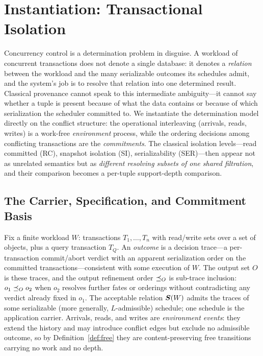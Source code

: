 %
\section{Instantiation: Transactional Isolation}
\label{sec:transactions}

Concurrency control is a determination problem in disguise. A workload of
concurrent transactions does not denote a single database: it denotes a
\emph{relation} between the workload and the many serializable outcomes its
schedules admit, and the system's job is to resolve that relation into one
determined result. Classical provenance cannot speak to this intermediate
ambiguity---it cannot say whether a tuple is present because of what the data
contains or because of which serialization the scheduler committed to. We
instantiate the determination model directly on the conflict structure: the
operational interleaving (arrivals, reads, writes) is a work-free
\emph{environment} process, while the ordering decisions among conflicting
transactions are the \emph{commitments}. The classical isolation levels---read
committed (RC), snapshot isolation (SI), serializability (SER)---then appear not
as unrelated semantics but as \emph{different resolving subsets of one shared
filtration}, and their comparison becomes a per-tuple support-depth comparison.

\subsection{The Carrier, Specification, and Commitment Basis}
\label{sec:txn-setup}

Fix a finite workload $W$: transactions $T_1,\dots,T_n$ with read/write sets
over a set of objects, plus a query transaction $T_Q$. An \emph{outcome} is a
decision trace---a per-transaction commit/abort verdict with an apparent
serialization order on the committed transactions---consistent with some
execution of $W$. The output set $O$ is these traces, and the output refinement
order $\preceq_O$ is sub-trace inclusion: $o_1 \preceq_O o_2$ when $o_2$ resolves
further fates or orderings without contradicting any verdict already fixed in
$o_1$. The acceptable relation $\boldsymbol{S}(W)$ admits the traces of some
serializable (more generally, $L$-admissible) schedule; one schedule is the
application carrier. Arrivals, reads, and writes are \emph{environment events}:
they extend the history and may introduce conflict edges but exclude no
admissible outcome, so by Definition~\ref{def:free} they are content-preserving
free transitions carrying no work and no depth.

